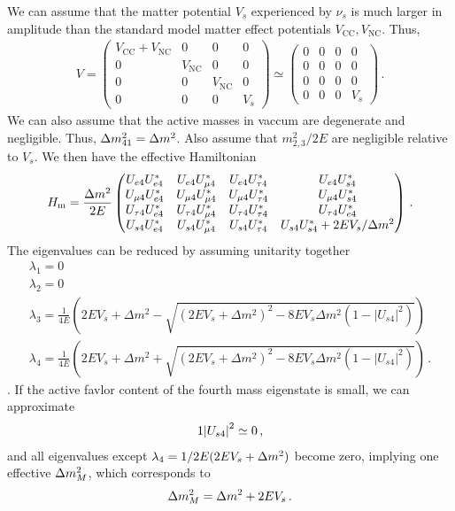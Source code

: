\documentclass[twocolumn]{article}
\newcommand{\ns}{\ensuremath{\nu_s}}
\renewcommand{\t}[1]{\ensuremath{\text{{#1}}}}
\newcommand*{\dm}[1][]{%
  \Delta m^2\ifx\\#1\\\else_\text{#1}\fi
}
\begin{document}
We can assume that the matter potential $V_s$ experienced by $\ns$ is much larger in amplitude than the standard model matter effect potentials $V_\t{CC}, V_\t{NC}$. Thus,
\begin{align*}
  V = \begin{pmatrix}
    V_\t{CC} + V_\t{NC} & 0 & 0 & 0 \\
    0 & V_\t{NC} & 0 & 0  \\
    0 & 0 & V_\t{NC} & 0  \\
    0 & 0 & 0 & V_s 
  \end{pmatrix}
  \simeq
  \begin{pmatrix}
    0 & 0 & 0 & 0\\
    0 & 0 & 0 & 0\\
    0 & 0 & 0 & 0\\
    0 & 0 & 0 & V_s
  \end{pmatrix}
\,.\end{align*}
We can also assume that the active masses in vaccum are degenerate and negligible. Thus, $\dm[41] = \dm$. Also assume that $m^2_{2,3}/2E$ are negligible relative to $V_s$. We then have the effective Hamiltonian
\begin{align*}
  H_\t{m} = \frac{\dm}{2E}\begin{pmatrix}
    U_{e4}U^*_{e4} & U_{e4}U^*_{\mu4} & U_{e4}U^*_{\tau4} & U_{e4}U^*_{s4} \\
    U_{\mu4}U^*_{e4} & U_{\mu4}U^*_{\mu4} & U_{\mu4}U^*_{\tau4} & U_{\mu4}U^*_{s4} \\
    U_{\tau4}U^*_{e4} & U_{\tau4}U^*_{\mu4} & U_{\tau4}U^*_{\tau4} & U_{\tau4}U^*_{e4} \\
    U_{s4}U^*_{e4} & U_{s4}U^*_{\mu4} & U_{s4}U^*_{\tau4} & U_{s4}U^*_{s4} + 2EV_s/\dm \\
  \end{pmatrix}
\,.\end{align*}
The eigenvalues can be reduced by assuming unitarity together
\begin{align*}
    \lambda_{1}=0 \\
    \lambda_{2}=0 \\
    \lambda_{3}=\frac{1}{4 E}\left(2 E V_{s}+\Delta m^{2}-\sqrt{\left(2 E V_{s}+\Delta m^{2}\right)^{2}-8 E V_{s} \Delta m^{2}\left(1-\left|U_{s 4}\right|^{2}\right)}\right) \\
    \lambda_{4}=\frac{1}{4 E}\left(2 E V_{s}+\Delta m^{2}+\sqrt{\left(2 E V_{s}+\Delta m^{2}\right)^{2}-8 E V_{s} \Delta m^{2}\left(1-\left|U_{s 4}\right|^{2}\right)}\right)
\,.\end{align*}.
If the active favlor content of the fourth mass eigenstate is small, we can approximate 
\begin{align*}
  1 \abs{U_{s4}}^2 \simeq 0
\,,\end{align*}
and all eigenvalues except $\lambda_4 = 1/2E(2EV_s + \dm)$ become zero, implying one effective $\dm_M$, which corresponds to 
\begin{align*}
  \dm_M = \dm + 2EV_s
\,.\end{align*}
\end{document}
